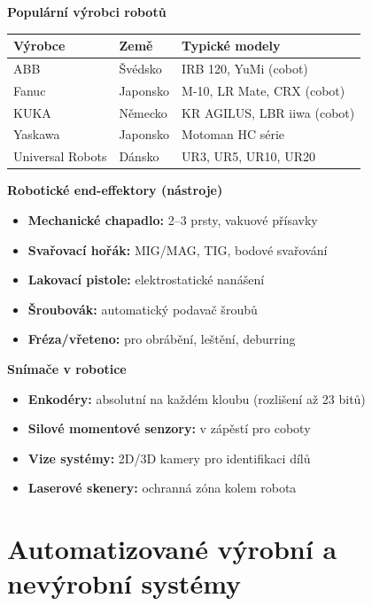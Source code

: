 \documentclass[a4paper,10pt]{article}
\begin{document}
\begin{vysvetlenibox}
\textbf{Populární výrobci robotů}
\begin{center}
\begin{tabular}{@{} l l l @{}}
    \toprule
    \textbf{Výrobce} & \textbf{Země} & \textbf{Typické modely} \\
    \midrule
    ABB & Švédsko & IRB 120, YuMi (cobot) \\
    Fanuc & Japonsko & M-10, LR Mate, CRX (cobot) \\
    KUKA & Německo & KR AGILUS, LBR iiwa (cobot) \\
    Yaskawa & Japonsko & Motoman HC série \\
    Universal Robots & Dánsko & UR3, UR5, UR10, UR20 \\
    \bottomrule
\end{tabular}
\end{center}

\textbf{Robotické end-effektory (nástroje)}
\begin{itemize}[noitemsep, leftmargin=1.4em, topsep=4pt]
    \item \textbf{Mechanické chapadlo:} 2--3 prsty, vakuové přísavky
    \item \textbf{Svařovací hořák:} MIG/MAG, TIG, bodové svařování
    \item \textbf{Lakovací pistole:} elektrostatické nanášení
    \item \textbf{Šroubovák:} automatický podavač šroubů
    \item \textbf{Fréza/vřeteno:} pro obrábění, leštění, deburring
\end{itemize}

\textbf{Snímače v robotice}
\begin{itemize}[noitemsep, leftmargin=1.4em, topsep=4pt]
    \item \textbf{Enkodéry:} absolutní na každém kloubu (rozlišení až 23 bitů)
    \item \textbf{Silové momentové senzory:} v zápěstí pro coboty
    \item \textbf{Vize systémy:} 2D/3D kamery pro identifikaci dílů
    \item \textbf{Laserové skenery:} ochranná zóna kolem robota
\end{itemize}
\end{vysvetlenibox}

\section{Automatizované výrobní a nevýrobní systémy}
\end{document}
